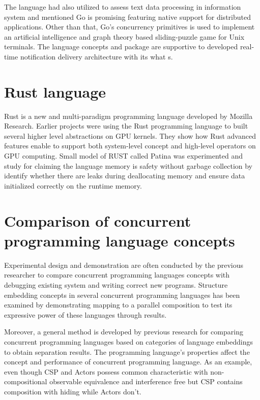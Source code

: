 The language had also utilized to assess text data processing in information system and mentioned Go is promising featuring native support for distributed applications. \cite{text-processing-performance-with-go} Other than that, Go’s concurrency primitives is used to implement an artificial intelligence and graph theory based sliding-puzzle game for Unix terminals. The language concepts and package are supportive to developed real-time notification delivery architecture with its what s. \cite{sliding-puzzle-game-with-go}

\pagebreak
\section{Rust language}

Rust is a new and multi-paradigm programming language developed by Mozilla Research.  \cite{rust} Earlier projects were using the Rust programming language to built several higher level abstractions on GPU kernels. They show how Rust advanced features enable to support both system-level concept and high-level operators on GPU computing. \cite{gpu-programming-with-rust} Small model of RUST called Patina was experimented and study for claiming the language memory is safety without garbage collection by identify whether there are leaks during deallocating memory and ensure data initialized correctly on the runtime memory. \cite{rust-patina}

\section{Comparison of concurrent programming language concepts}

Experimental design and demonstration are often conducted by the previous researcher to compare concurrent programming languages concepts with debugging existing system and writing correct new programs. \cite{comparing-usability-language} Structure embedding concepts in several concurrent programming languages has been examined by demonstrating mapping to a parallel composition to test its expressive power of these languages through results. \cite{embedding-among-languages} 

Moreover, a general method is developed by previous research for comparing concurrent programming languages based on categories of language embeddings to obtain separation results. The programming language's properties affect the concept and performance of concurrent programming language. As an example, even though CSP and Actors possess common characteristic with non-compositional observable equivalence and interference free but CSP contains composition with hiding while Actors don’t.  \cite{separate-languages-with-categories}

